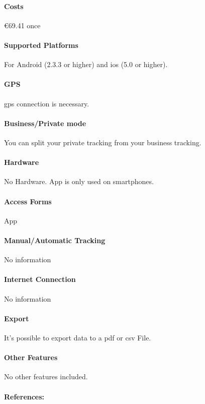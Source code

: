 \paragraph{Costs} \euro 69.41 once
\paragraph{Supported Platforms} For Android (2.3.3 or higher) and \gls{ios} (5.0 or higher).
\paragraph{GPS} \gls{gps} connection is necessary.
\paragraph{Business/Private mode} You can split your private tracking from your business tracking.
\paragraph{Hardware} No Hardware. App is only used on smartphones.
\paragraph{Access Forms} App
\paragraph{Manual/Automatic Tracking} No information
\paragraph{Internet Connection}No information
\paragraph{Export} It’s possible to export data to a \gls{pdf} or \gls{csv} File.
\paragraph{Other Features} No other features included.
\paragraph{References:} \cite{Electronic_Logbook_from_TOMTOM}
\newpage

